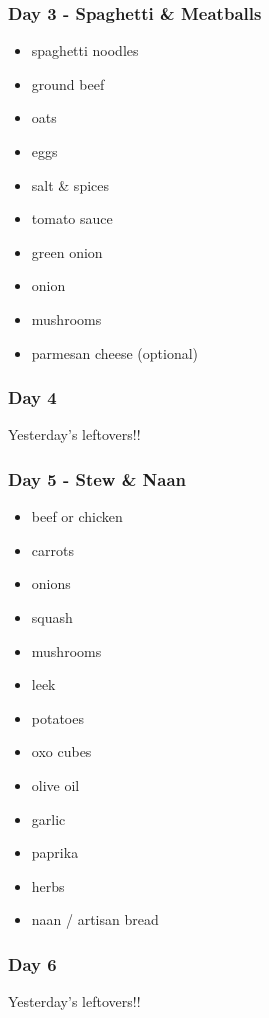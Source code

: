 \documentclass[11pt, a4paper]{article}
\begin{document}
\subsubsection{Day 3 - Spaghetti \& Meatballs}
\vspace{1pc}
\begin{itemize}
\item spaghetti noodles
\item ground beef
\item oats
\item eggs
\item salt \& spices
\item tomato sauce
\item green onion
\item onion
\item mushrooms
\item parmesan cheese (optional)
\end{itemize}

\subsubsection{Day 4}
\vspace{1pc}
Yesterday's leftovers!!
\vspace{2pc}

\subsubsection{Day 5 - Stew \& Naan}
\vspace{1pc}
\begin{itemize}
\item beef or chicken
\item carrots
\item onions
\item squash
\item mushrooms
\item leek
\item potatoes
\item oxo cubes
\item olive oil
\item garlic
\item paprika
\item herbs
\item naan / artisan bread
\end{itemize}

\subsubsection{Day 6}
\vspace{1pc}
Yesterday's leftovers!!
\vspace{2pc}
\end{document}

